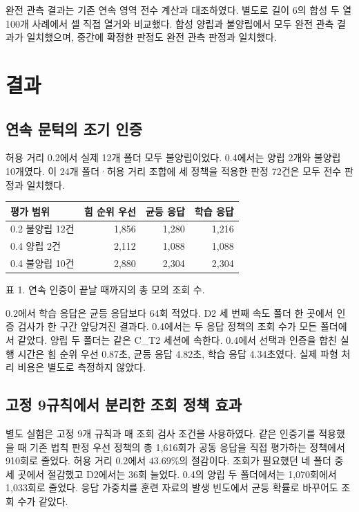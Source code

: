\documentclass[11pt,a4paper]{article}
\begin{document}
완전 관측 결과는 기존 연속 영역 전수 계산과 대조하였다. 별도로 길이 6의 합성 두 열 100개 사례에서 셀 직접 열거와 비교했다. 합성 양립과 불양립에서 모두 완전 관측 결과가 일치했으며, 중간에 확정한 판정도 완전 관측 판정과 일치했다.

\clearpage
\section{결과}
\subsection*{연속 문턱의 조기 인증}
허용 거리 0.2에서 실제 12개 폴더 모두 불양립이었다. 0.4에서는 양립 2개와 불양립 10개였다. 이 24개 폴더·허용 거리 조합에 세 정책을 적용한 판정 72건은 모두 전수 판정과 일치했다.

\begin{center}
\small
\begin{tabularx}{\linewidth}{Xrrr}
\toprule
평가 범위 & 힘 순위 우선 & 균등 응답 & 학습 응답 \\
\midrule
0.2 불양립 12건 & 1,856 & 1,280 & 1,216 \\
0.4 양립 2건 & 2,112 & 1,088 & 1,088 \\
0.4 불양립 10건 & 2,880 & 2,304 & 2,304 \\
\bottomrule
\end{tabularx}
\end{center}
\noindent 표 1. 연속 인증이 끝날 때까지의 총 모의 조회 수.

0.2에서 학습 응답은 균등 응답보다 64회 적었다. D2 세 번째 속도 폴더 한 곳에서 인증 검사가 한 구간 앞당겨진 결과다. 0.4에서는 두 응답 정책의 조회 수가 모든 폴더에서 같았다. 양립 두 폴더는 같은 C\_T2 세션에 속한다. 0.4에서 선택과 인증을 합친 실행 시간은 힘 순위 우선 0.87초, 균등 응답 4.82초, 학습 응답 4.34초였다. 실제 파형 처리 비용은 별도로 측정하지 않았다.

\subsection*{고정 9규칙에서 분리한 조회 정책 효과}
별도 실험은 고정 9개 규칙과 매 조회 검사 조건을 사용하였다. 같은 인증기를 적용했을 때 기존 법칙 판정 우선 정책의 총 1,616회가 공동 응답을 직접 평가하는 정책에서 910회로 줄었다. 허용 거리 0.2에서 \(43.69\%\)의 절감이다. 조회가 필요했던 네 폴더 중 세 곳에서 절감했고 D2에서는 36회 늘었다. 0.4의 양립 두 폴더에서는 1,070회에서 1,033회로 줄었다. 응답 가중치를 훈련 자료의 발생 빈도에서 균등 확률로 바꾸어도 조회 수가 같았다.
\end{document}

